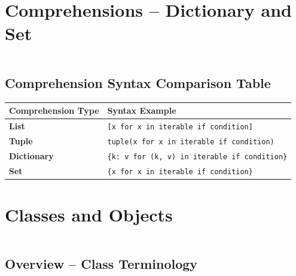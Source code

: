 \documentclass[a4paper,11pt]{article}
\begin{document}
	
		\newpage
		
	\section{Comprehensions – Dictionary and Set}
	\inputminted{python}{Python_Files/comprehensions_dict_set_guid.py}
	
	\vspace{1em}
	\subsection*{Comprehension Syntax Comparison Table}
	
	\renewcommand{\arraystretch}{1.6}
	\begin{tabular}{>{\bfseries}p{3.5cm} p{8.5cm}}
		\toprule
		Comprehension Type & Syntax Example \\
		\midrule
		
		List & \texttt{[x for x in iterable if condition]} \\
		Tuple & \texttt{tuple(x for x in iterable if condition)} \\
		Dictionary & \texttt{\{k: v for (k, v) in iterable if condition\}} \\
		Set & \texttt{\{x for x in iterable if condition\}} \\
		
		\bottomrule
	\end{tabular}
	
		\newpage
		
\section{Classes and Objects}
\inputminted{python}{Python_Files/class_intro_guid.py}

\vspace{1em}
\subsection*{Overview – Class Terminology}
\end{document}
